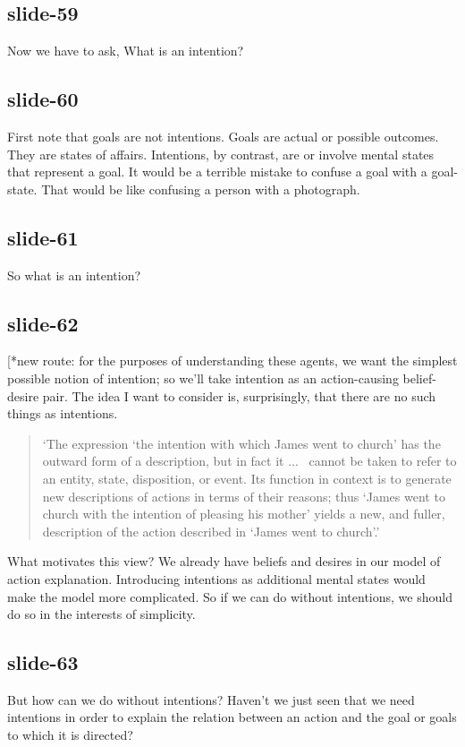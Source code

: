 \documentclass[12pt,\papersize]{extarticle}
\begin{document}
 
\subsection{slide-59}
Now we have to ask, What is an intention?
 
 
\subsection{slide-60}
First note that goals are not intentions.
Goals are actual or possible outcomes.
They are states of affairs.
Intentions, by contrast, are or involve mental states that represent a goal.
It would be a terrible mistake to confuse a goal with a goal-state.
That would be like confusing a person with a photograph.
 
 
\subsection{slide-61}
So what is an intention?
 
 
\subsection{slide-62}
[*new route: for the purposes of understanding these agents, we want the simplest possible notion of intention; so we'll take intention as an action-causing belief-desire pair.
The idea I want to consider is, surprisingly, that there are no such things as intentions.
\begin{quote}
`The expression `the intention with which James went to church' has the outward form of a description, but in fact it
...\ %
cannot be taken to refer to an entity, state, disposition, or event. Its function in context is to generate new descriptions of actions in terms of their reasons; thus `James went to church with the intention of pleasing his mother' yields a new, and fuller, description of the action described in `James went to church'.'
\citep[p.\ 690]{davidson:1963_orig}
\end{quote}
What motivates this view?
We already have beliefs and desires in our model of action explanation.
Introducing intentions as additional mental states would make the model more complicated.
So if we can do without intentions, we should do so in the interests of simplicity.
 
 
\subsection{slide-63}
But how can we do without intentions?
Haven't we just seen that we need intentions in order to explain the relation between an action and the goal or goals to which it is directed?
 
\end{document}
